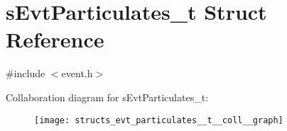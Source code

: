 \hypertarget{structs_evt_particulates__t}{}\section{s\+Evt\+Particulates\+\_\+t Struct Reference}
\label{structs_evt_particulates__t}


{\ttfamily \#include $<$event.\+h$>$}



Collaboration diagram for s\+Evt\+Particulates\+\_\+t\+:\nopagebreak
\begin{figure}[H]
\begin{center}
\leavevmode
\texttt{[image: structs\_evt\_particulates\_\_t\_\_coll\_\_graph]}
\end{center}
\end{figure}
